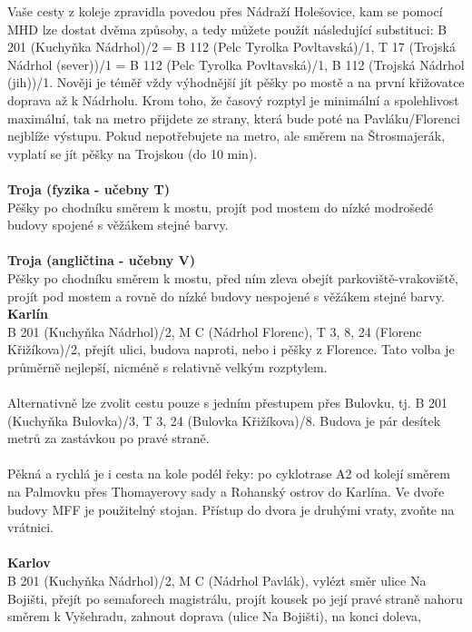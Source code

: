 Vaše cesty z koleje zpravidla povedou přes Nádraží Holešovice, kam se pomocí MHD
lze dostat dvěma způsoby, a tedy můžete použít následující substituci: B 201
(Kuchyňka \ra Nádrhol)/2 = B 112 (Pelc Tyrolka \ra Povltavská)/1, T 17 (Trojská
\ra
Nádrhol (sever))/1 = B 112 (Pelc Tyrolka \ra Povltavská)/1, B 112 (Trojská \ra
Nádrhol (jih))/1. Nověji je téměř vždy výhodnější jít pěšky po mostě a na první
křižovatce doprava až k Nádrholu. Krom toho, že časový rozptyl je minimální a
spolehlivost maximální, tak na metro přijdete ze strany, která bude poté na
Pavláku/Florenci nejblíže výstupu. Pokud nepotřebujete na metro, ale směrem na
Štrosmajerák, vyplatí se jít pěšky na Trojskou (do 10 min).
\\\\
\textbf{Troja (fyzika - učebny T)}\\
Pěšky po chodníku směrem k mostu, projít pod mostem do nízké modrošedé budovy
spojené s věžákem stejné barvy.
\\\\
\textbf{Troja (angličtina - učebny V)}\\
Pěšky po chodníku směrem k mostu, před ním zleva obejít parkoviště-vrakoviště,
projít pod mostem a rovně do nízké budovy nespojené s věžákem stejné barvy.
\\
\textbf{Karlín}\\
B 201 (Kuchyňka \ra Nádrhol)/2, M C (Nádrhol \ra Florenc), T 3, 8, 24 (Florenc
\ra Křižíkova)/2, přejít ulici, budova naproti, nebo i pěšky z Florence. Tato
volba je průměrně nejlepší, nicméně s relativně velkým rozptylem.
\\\\
Alternativně lze zvolit cestu pouze s jedním přestupem přes Bulovku, tj. B 201
(Kuchyňka \ra Bulovka)/3, T 3, 24 (Bulovka \ra Křižíkova)/8. Budova je pár
desítek metrů za zastávkou po pravé straně.
\\\\
Pěkná a rychlá je i cesta na kole podél řeky: po cyklotrase A2 od kolejí směrem
na Palmovku přes Thomayerovy sady a Rohanský ostrov do Karlína. Ve dvoře budovy
MFF je použitelný stojan. Přístup do dvora je druhými vraty, zvoňte na vrátnici.
\\\\
\textbf{Karlov} \\
B 201 (Kuchyňka \ra Nádrhol)/2, M C (Nádrhol \ra Pavlák), vylézt směr ulice Na
Bojišti, přejít po semaforech magistrálu, projít kousek po její pravé straně
nahoru směrem k Vyšehradu, zahnout doprava (ulice Na Bojišti), na konci doleva,
